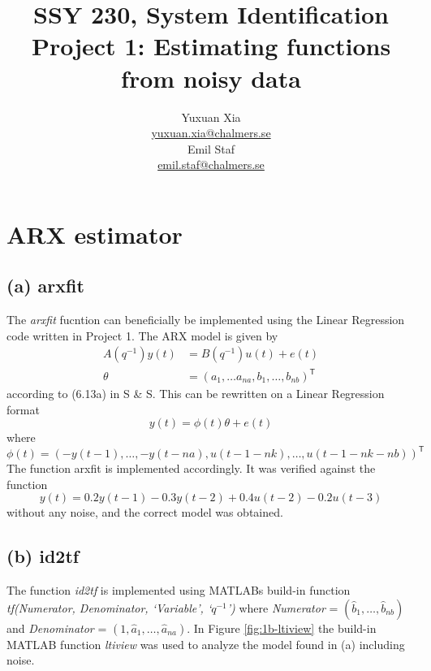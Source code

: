 \documentclass[]{article}
\title{SSY 230, System Identification\\
	Project 1: Estimating functions from noisy data}
\author{Yuxuan Xia\\ \href{mailto:yuxuan.xia@chalmers.se}{yuxuan.xia@chalmers.se}\\Emil Staf\\\href{mailto:emil.staf@chalmers.se}{emil.staf@chalmers.se}}
\begin{document}
\maketitle

\section{ARX estimator}
\subsection{(a) arxfit}
The \emph{arxfit} fucntion can beneficially be implemented using the Linear Regression code written in Project 1. The ARX model is given by
\begin{align}
	\label{eq:ARX}
	A(q^{-1})y(t) &= B(q^{-1})u(t) + e(t) \\
	\theta &= (a_1, \ldots a_{na}, b_1, \ldots, b_{nb})^\mathsf{T}
\end{align}
according to (6.13a) in S \& S. This can be rewritten on a Linear Regression format
\begin{equation}
	\label{eq:ARX_LR}
	y(t) = \phi(t) \theta + e(t)
\end{equation}
where
\begin{equation}
	\label{eq:ARX_LR_phi}
	\phi(t) = (-y(t-1), \ldots, -y(t-na), u(t-1-nk), \ldots, u(t-1-nk-nb))^\mathsf{T}
\end{equation}
The function arxfit is implemented accordingly. It was verified against the function 
\begin{equation}
	\label{eq:system}
	y(t) = 0.2y(t-1) - 0.3y(t-2) + 0.4u(t-2) - 0.2u(t-3)
\end{equation}
without any noise, and the correct model was obtained.

\subsection{(b) id2tf}
The function \emph{id2tf} is implemented using MATLABs build-in function \emph{tf(Numerator, Denominator, `Variable', `$q^{-1}$')} where \emph{Numerator} = $(\hat{b}_1, \ldots, \hat{b}_{nb})$ and \emph{Denominator} = $(1, \hat{a}_1, \ldots, \hat{a}_{na})$. In Figure \ref{fig:1b-ltiview} the build-in MATLAB function \emph{ltiview} was used to analyze the model found in (a) including noise.
\end{document}
